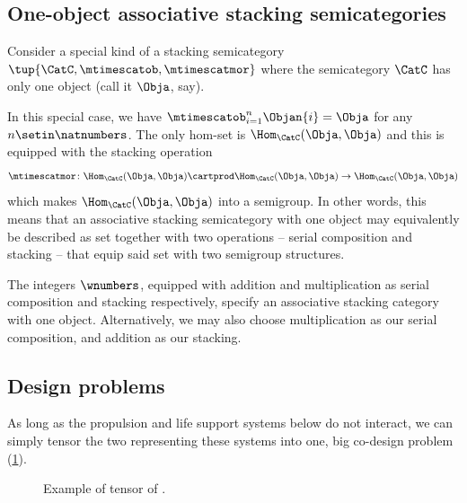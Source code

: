 \subsection{One-object associative stacking semicategories}

Consider a special kind of a stacking semicategory $\tup{\CatC, \mtimescatob, \mtimescatmor}$ where the semicategory $\CatC$ has only one object (call it $\Obja$, say).

In this special case, we have $\mtimescatob_{i=1}^n \Objan{i} = \Obja$ for any $n \setin \natnumbers$.
The only hom-set is $\Hom_\CatC(\Obja, \Obja)$ and this is equipped with the stacking operation
\begin{equation}
    \mtimescatmor \colon \Hom_\CatC(\Obja, \Obja) \cartprod \Hom_\CatC(\Obja, \Obja) \to \Hom_\CatC(\Obja, \Obja)
\end{equation}
which makes $\Hom_\CatC(\Obja, \Obja)$ into a semigroup.
In other words, this means that an associative stacking semicategory with one object may equivalently be described as set together with two operations -- serial composition and stacking -- that equip said set with two semigroup structures.

\begin{example}
    The integers $\wnumbers$, equipped with addition and multiplication as serial composition and stacking respectively, specify an associative stacking category with one object.
    Alternatively, we may also choose multiplication as our serial composition, and addition as our stacking.
\end{example}

\subsection{Design problems}

\begin{example}
    As long as the propulsion and life support systems below do not interact, we can simply tensor the two  representing these systems into one, big co-design problem (\cref{fig:examplemonoidal}).
    \begin{figure}[h!]
        \centering
        \caption{Example of tensor of . }
        \label{fig:examplemonoidal}
    \end{figure}
\end{example}

